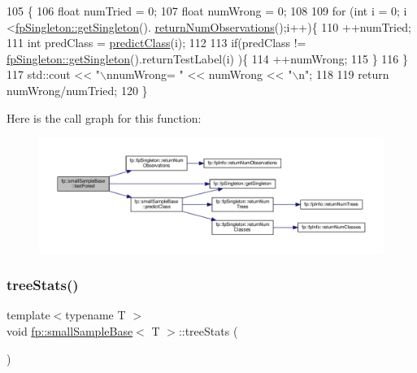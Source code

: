 \begin{DoxyCode}
105                               \{
106                 \textcolor{keywordtype}{float} numTried = 0;
107                 \textcolor{keywordtype}{float} numWrong = 0;
108 
109                 \textcolor{keywordflow}{for} (\textcolor{keywordtype}{int} i = 0; i <\hyperlink{classfp_1_1fpSingleton_a8bdae77b68521003e3fc630edec2e240}{fpSingleton::getSingleton}().
      \hyperlink{classfp_1_1fpSingleton_ae12f22ad096ff0d419fce47df710bf78}{returnNumObservations}();i++)\{
110                     ++numTried;
111                     \textcolor{keywordtype}{int} predClass = \hyperlink{classfp_1_1smallSampleBase_a616b7c06887cf4a1ac919bc3846a7933}{predictClass}(i);
112 
113                     \textcolor{keywordflow}{if}(predClass != \hyperlink{classfp_1_1fpSingleton_a8bdae77b68521003e3fc630edec2e240}{fpSingleton::getSingleton}().returnTestLabel(i)
      )\{
114                         ++numWrong;
115                     \}
116                 \}
117                 std::cout << \textcolor{stringliteral}{"\(\backslash\)nnumWrong= "} << numWrong << \textcolor{stringliteral}{"\(\backslash\)n"};
118 
119                 \textcolor{keywordflow}{return} numWrong/numTried;
120             \}
\end{DoxyCode}
Here is the call graph for this function\+:\nopagebreak
\begin{figure}[H]
\begin{center}
\leavevmode
\includegraphics[width=350pt]{classfp_1_1smallSampleBase_a02b01949b6ed9cc6644b045a468609cc_cgraph}
\end{center}
\end{figure}
\mbox{\label{classfp_1_1smallSampleBase_acc948b260715a190675a5d5ebedf0429}} 
\subsubsection{\texorpdfstring{tree\+Stats()}{treeStats()}}
{\footnotesize\ttfamily template$<$typename T $>$ \\
void \hyperlink{classfp_1_1smallSampleBase}{fp\+::small\+Sample\+Base}$<$ T $>$\+::tree\+Stats (\begin{DoxyParamCaption}{ }\end{DoxyParamCaption})\hspace{0.3cm}{\ttfamily [inline]}}




